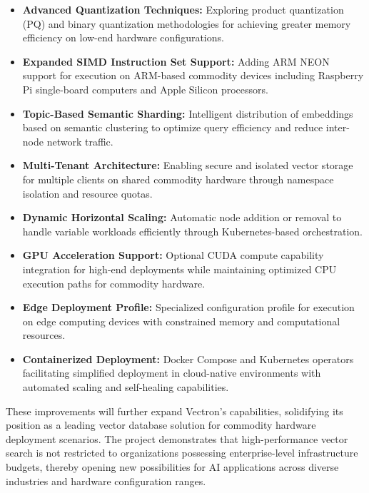 \begin{itemize}
    \item \textbf{Advanced Quantization Techniques:} Exploring product quantization (PQ) and binary quantization methodologies for achieving greater memory efficiency on low-end hardware configurations.
    
    \item \textbf{Expanded SIMD Instruction Set Support:} Adding ARM NEON support for execution on ARM-based commodity devices including Raspberry Pi single-board computers and Apple Silicon processors.
    
    \item \textbf{Topic-Based Semantic Sharding:} Intelligent distribution of embeddings based on semantic clustering to optimize query efficiency and reduce inter-node network traffic.
    
    \item \textbf{Multi-Tenant Architecture:} Enabling secure and isolated vector storage for multiple clients on shared commodity hardware through namespace isolation and resource quotas.
    
    \item \textbf{Dynamic Horizontal Scaling:} Automatic node addition or removal to handle variable workloads efficiently through Kubernetes-based orchestration.
    
    \item \textbf{GPU Acceleration Support:} Optional CUDA compute capability integration for high-end deployments while maintaining optimized CPU execution paths for commodity hardware.
    
    \item \textbf{Edge Deployment Profile:} Specialized configuration profile for execution on edge computing devices with constrained memory and computational resources.
    
    \item \textbf{Containerized Deployment:} Docker Compose and Kubernetes operators facilitating simplified deployment in cloud-native environments with automated scaling and self-healing capabilities.
\end{itemize}

These improvements will further expand Vectron's capabilities, solidifying its position as a leading vector database solution for commodity hardware deployment scenarios. The project demonstrates that high-performance vector search is not restricted to organizations possessing enterprise-level infrastructure budgets, thereby opening new possibilities for AI applications across diverse industries and hardware configuration ranges.